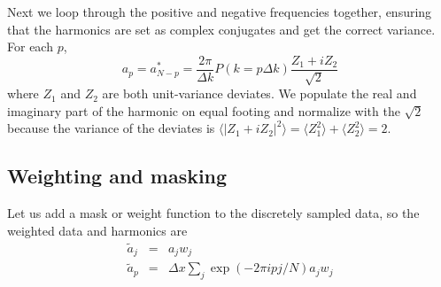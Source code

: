 Next we loop through the positive and negative frequencies together, ensuring that the harmonics are set as complex conjugates and get the correct variance.  For each $p$, 
\begin{equation}
  a_p =  a^*_{N-p} = \frac{2\pi}{\Delta k } P(k = p \Delta k) \frac{Z_1 + i Z_2}{\sqrt{2}}
\end{equation}
where $Z_1$ and $Z_2$ are both unit-variance deviates.  We populate the real and imaginary part of the harmonic on equal footing and normalize with the $\sqrt{2}$ because the variance of the deviates is $\langle |Z_1 + i Z_2 |^2 \rangle = \langle Z_1^2\rangle + \langle Z_2^2  \rangle = 2$.

\subsection{Weighting and masking}
 Let us add a mask or weight function to the discretely sampled data, so the weighted data and harmonics are
 \begin{eqnarray}
   \tilde a_j &=& a_j w_j \\
   \tilde a_p &=& \Delta x \sum_j \exp(-2\pi i pj/N) a_j w_j
 \end{eqnarray}

